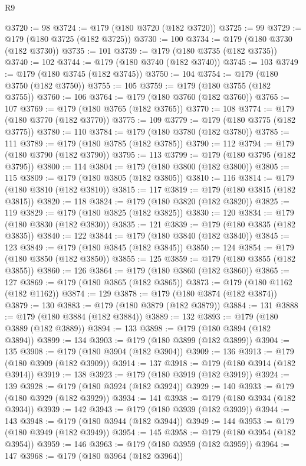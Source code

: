 \begin{lexlean}{R9}
\begin{coremodule}
@3720 := 98
@3724 := @179 (@180 @3720 (@182 @3720))
@3725 := 99
@3729 := @179 (@180 @3725 (@182 @3725))
@3730 := 100
@3734 := @179 (@180 @3730 (@182 @3730))
@3735 := 101
@3739 := @179 (@180 @3735 (@182 @3735))
@3740 := 102
@3744 := @179 (@180 @3740 (@182 @3740))
@3745 := 103
@3749 := @179 (@180 @3745 (@182 @3745))
@3750 := 104
@3754 := @179 (@180 @3750 (@182 @3750))
@3755 := 105
@3759 := @179 (@180 @3755 (@182 @3755))
@3760 := 106
@3764 := @179 (@180 @3760 (@182 @3760))
@3765 := 107
@3769 := @179 (@180 @3765 (@182 @3765))
@3770 := 108
@3774 := @179 (@180 @3770 (@182 @3770))
@3775 := 109
@3779 := @179 (@180 @3775 (@182 @3775))
@3780 := 110
@3784 := @179 (@180 @3780 (@182 @3780))
@3785 := 111
@3789 := @179 (@180 @3785 (@182 @3785))
@3790 := 112
@3794 := @179 (@180 @3790 (@182 @3790))
@3795 := 113
@3799 := @179 (@180 @3795 (@182 @3795))
@3800 := 114
@3804 := @179 (@180 @3800 (@182 @3800))
@3805 := 115
@3809 := @179 (@180 @3805 (@182 @3805))
@3810 := 116
@3814 := @179 (@180 @3810 (@182 @3810))
@3815 := 117
@3819 := @179 (@180 @3815 (@182 @3815))
@3820 := 118
@3824 := @179 (@180 @3820 (@182 @3820))
@3825 := 119
@3829 := @179 (@180 @3825 (@182 @3825))
@3830 := 120
@3834 := @179 (@180 @3830 (@182 @3830))
@3835 := 121
@3839 := @179 (@180 @3835 (@182 @3835))
@3840 := 122
@3844 := @179 (@180 @3840 (@182 @3840))
@3845 := 123
@3849 := @179 (@180 @3845 (@182 @3845))
@3850 := 124
@3854 := @179 (@180 @3850 (@182 @3850))
@3855 := 125
@3859 := @179 (@180 @3855 (@182 @3855))
@3860 := 126
@3864 := @179 (@180 @3860 (@182 @3860))
@3865 := 127
@3869 := @179 (@180 @3865 (@182 @3865))
@3873 := @179 (@180 @1162 (@182 @1162))
@3874 := 129
@3878 := @179 (@180 @3874 (@182 @3874))
@3879 := 130
@3883 := @179 (@180 @3879 (@182 @3879))
@3884 := 131
@3888 := @179 (@180 @3884 (@182 @3884))
@3889 := 132
@3893 := @179 (@180 @3889 (@182 @3889))
@3894 := 133
@3898 := @179 (@180 @3894 (@182 @3894))
@3899 := 134
@3903 := @179 (@180 @3899 (@182 @3899))
@3904 := 135
@3908 := @179 (@180 @3904 (@182 @3904))
@3909 := 136
@3913 := @179 (@180 @3909 (@182 @3909))
@3914 := 137
@3918 := @179 (@180 @3914 (@182 @3914))
@3919 := 138
@3923 := @179 (@180 @3919 (@182 @3919))
@3924 := 139
@3928 := @179 (@180 @3924 (@182 @3924))
@3929 := 140
@3933 := @179 (@180 @3929 (@182 @3929))
@3934 := 141
@3938 := @179 (@180 @3934 (@182 @3934))
@3939 := 142
@3943 := @179 (@180 @3939 (@182 @3939))
@3944 := 143
@3948 := @179 (@180 @3944 (@182 @3944))
@3949 := 144
@3953 := @179 (@180 @3949 (@182 @3949))
@3954 := 145
@3958 := @179 (@180 @3954 (@182 @3954))
@3959 := 146
@3963 := @179 (@180 @3959 (@182 @3959))
@3964 := 147
@3968 := @179 (@180 @3964 (@182 @3964))

\end{coremodule}
\end{lexlean}
